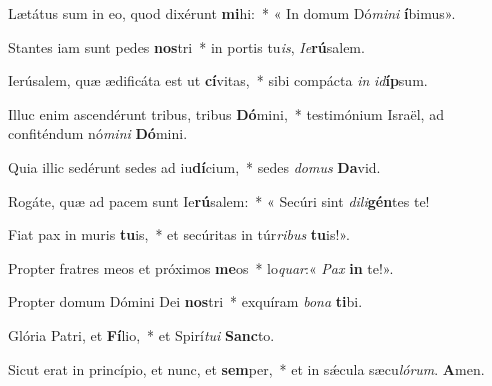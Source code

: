 \item Lætátus sum in eo, quod dixérunt \textbf{mi}hi:~* « In domum Dó\textit{mi}\textit{ni} \textbf{í}bimus».

\item Stantes iam sunt pedes \textbf{nos}tri~* in portis tu\textit{is}, \textit{Ie}\textbf{rú}salem.

\item Ierúsalem, quæ ædificáta est ut \textbf{cí}vitas,~* sibi compácta \textit{in} \textit{id}\textbf{íp}sum.

\item Illuc enim ascendérunt tribus, tribus \textbf{Dó}mini,~* testimónium Israël, ad confiténdum nó\textit{mi}\textit{ni} \textbf{Dó}mini.

\item Quia illic sedérunt sedes ad iu\textbf{dí}cium,~* sedes \textit{do}\textit{mus} \textbf{Da}vid.

\item Rogáte, quæ ad pacem sunt Ie\textbf{rú}salem:~* « Secúri sint \textit{di}\textit{li}\textbf{gén}tes te!

\item Fiat pax in muris \textbf{tu}is,~* et secúritas in túr\textit{ri}\textit{bus} \textbf{tu}is!».

\item Propter fratres meos et próximos \textbf{me}os~* lo\textit{quar}:« \textit{Pax} \textbf{in} te!».

\item Propter domum Dómini Dei \textbf{nos}tri~* exquíram \textit{bo}\textit{na} \textbf{ti}bi.

\item Glória Patri, et \textbf{Fí}lio,~* et Spirí\textit{tu}\textit{i} \textbf{Sanc}to.

\item Sicut erat in princípio, et nunc, et \textbf{sem}per,~* et in sǽcula sæcu\textit{ló}\textit{rum}. \textbf{A}men.